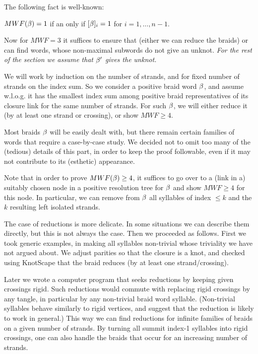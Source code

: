 The following fact is well-known:

\begin{theorem}\label{th4.1}
$MWF(\beta)=1$ if an only if $[\beta]_i=1$ for $i=1,\dots,n-1$.
\end{theorem}

Now for $MWF=3$ it suffices to ensure that (either we can reduce the
braids) or can find words, whose non-maximal subwords do not
give an unknot. \em{For the rest of the section we assume that
$\beta'$ gives the unknot.}

We will work by induction on the number of strands, and for
fixed number of strands on the index sum. So we consider a
positive braid word $\beta$, and assume w.l.o.g. it has the
smallest index sum among positive braid representatives of
its closure link for the same number of strands. For such
$\beta$, we will either reduce it (by at least one strand or
crossing), or show $MWF\ge 4$.

Most braids $\beta$ will be easily dealt with, but there remain certain
families of words that require a case-by-case study. We decided not
to omit too many of the (tedious) details of this part, in order
to keep the proof followable, even if it may not contribute to
its (esthetic) appearance.

Note that in order to prove $MWF(\beta)\ge 4$, it suffices to
go over to a (link in a) suitably chosen node in a positive
resolution tree for $\beta$ and show $MWF\ge 4$ for this node. In
particular, we can remove from $\beta$ all syllables of index $\le
k$ and the $k$ resulting left isolated strands.

The case of reductions is more delicate. In some situations
we can describe them directly, but this is not always the case.
Then we proceeded as follows. First we took generic examples, in
making all syllables non-trivial whose triviality we have not argued
about. We adjust parities so that the closure is a knot, and checked
using KnotScape \cite{KnotScape} that the braid reduces (by at least one
strand/crossing).

Later we wrote a computer program that seeks reductions by keeping
given crossings rigid. Such reductions would commute with replacing
rigid crossings by any tangle, in particular by any non-trivial
braid word syllable. (Non-trivial syllables behave
similarly to  rigid vertices, and suggest that the reduction
is likely to work in general.) This way we can find reductions for
infinite families of braids on a given number of strands. By turning
all summit index-1 syllables into rigid crossings, one can also
handle the braids that occur for an increasing number of strands.


